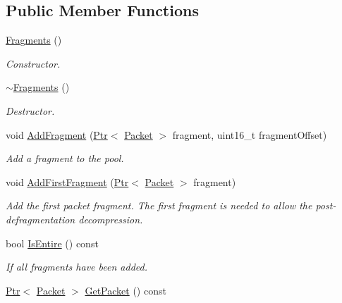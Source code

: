 \subsection*{Public Member Functions}
\begin{DoxyCompactItemize}
\item 
\hyperlink{classns3_1_1SixLowPanNetDevice_1_1Fragments_a8ca09ce2a3c2927000e22144a66bcb3b}{Fragments} ()
\begin{DoxyCompactList}\small\item\em Constructor. \end{DoxyCompactList}\item 
\hyperlink{classns3_1_1SixLowPanNetDevice_1_1Fragments_ac4db421b47c1f9290df0e222307e8037}{$\sim$\+Fragments} ()
\begin{DoxyCompactList}\small\item\em Destructor. \end{DoxyCompactList}\item 
void \hyperlink{classns3_1_1SixLowPanNetDevice_1_1Fragments_a7f8580f8ed83ee1c645d29653cc7b770}{Add\+Fragment} (\hyperlink{classns3_1_1Ptr}{Ptr}$<$ \hyperlink{classns3_1_1Packet}{Packet} $>$ fragment, uint16\+\_\+t fragment\+Offset)
\begin{DoxyCompactList}\small\item\em Add a fragment to the pool. \end{DoxyCompactList}\item 
void \hyperlink{classns3_1_1SixLowPanNetDevice_1_1Fragments_aee82cb2d2a1a2b47172d738bbbcb8663}{Add\+First\+Fragment} (\hyperlink{classns3_1_1Ptr}{Ptr}$<$ \hyperlink{classns3_1_1Packet}{Packet} $>$ fragment)
\begin{DoxyCompactList}\small\item\em Add the first packet fragment. The first fragment is needed to allow the post-\/defragmentation decompression. \end{DoxyCompactList}\item 
bool \hyperlink{classns3_1_1SixLowPanNetDevice_1_1Fragments_a32976c8ae7f70deba97aefbcd037c7e5}{Is\+Entire} () const 
\begin{DoxyCompactList}\small\item\em If all fragments have been added. \end{DoxyCompactList}\item 
\hyperlink{classns3_1_1Ptr}{Ptr}$<$ \hyperlink{classns3_1_1Packet}{Packet} $>$ \hyperlink{classns3_1_1SixLowPanNetDevice_1_1Fragments_a9df693069547cc25cde64f97f5ad2a62}{Get\+Packet} () const 

\end{DoxyCompactItemize}
